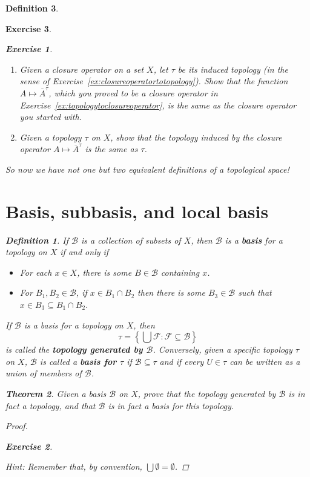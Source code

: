 \documentclass[12pt]{amsart}
\newtheorem{theorem}{Theorem}[section]
\newtheorem{exercise}{Exercise}[section]
\theoremstyle{definition}
\newtheorem{definition}[theorem]{Definition}
\theoremstyle{remark}
\newcommand{\explicitSet}[1]{\left\lbrace #1 \right\rbrace}
\newcommand{\set}[2]{\explicitSet{#1 \colon #2}}
\newcommand{\0}{\emptyset}
\newcommand{\closure}[1]{\overline{#1}}
\newcommand{\F}{\mathcal F}
\newcommand{\B}{\mathcal B}
\begin{document}
\begin{definition}
\begin{exercise}
\begin{exercise}
\begin{enumerate}
\item Given a closure operator on a set $X$, let $\tau$ be its induced topology (in the sense of Exercise~\ref{ex:closureoperatortotopology}). Show that the function $A \mapsto \closure{A}^\tau$, which you proved to be a closure operator in Exercise~\ref{ex:topologytoclosureoperator}, is the same as the closure operator you started with.
\item Given a topology $\tau$ on $X$, show that the topology induced by the closure operator $A \mapsto \closure{A}^\tau$ is the same as $\tau$.
\end{enumerate}
\end{exercise}

So now we have not one but two equivalent definitions of a topological space!

\section{Basis, subbasis, and local basis}

\begin{definition}
If $\B$ is a collection of subsets of $X$, then $\B$ is a \textbf{basis} for a topology on $X$ if and only if
\begin{itemize}
\item For each $x \in X$, there is some $B \in \B$ containing $x$.
\item For $B_1,B_2 \in \B$, if $x \in B_1 \cap B_2$ then there is some $B_3 \in \B$ such that $x \in B_3 \subseteq B_1 \cap B_2$.
\end{itemize}
\end{definition}

If $\B$ is a basis for a topology on $X$, then
$$\tau = \set{\bigcup \F}{\F \subseteq \B}$$
is called the \textbf{topology generated by $\B$}. Conversely, given a specific topology $\tau$ on $X$, $\B$ is called a \textbf{basis for $\tau$} if $\B \subseteq \tau$ and if every $U \in \tau$ can be written as a union of members of $\B$.

\begin{theorem}
Given a basis $\B$ on $X$, prove that the topology generated by $\B$ is in fact a topology, and that $\B$ is in fact a basis for this topology.
\end{theorem}
\begin{proof}
\begin{exercise}\end{exercise}
\emph{Hint: Remember that, by convention, $\bigcup \0 = \0$.}
\end{proof}


\end{exercise}
\end{definition}
\end{document}
